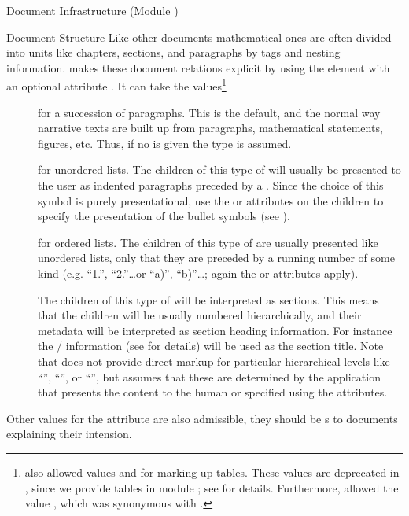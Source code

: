 \begin{tchapter}[id=omdoc-infrastructure,short=Document Infrastructure]{Document Infrastructure (Module )}
{\begin{tsection}[id=sectioning]{Document Structure}
  Like other documents mathematical ones are often divided into units like chapters,
  sections, and paragraphs by tags and nesting information. \omdoc makes these document
  relations explicit by using the  element with an optional attribute
  . It can take the values\footnote{ also allowed
    values  and
     for marking up tables.  These values
    are deprecated in , since we provide tables in module ;
    see  for details. Furthermore,  allowed the value
    , which was synonymous with
    .}
\begin{description}
\item[] for a succession of paragraphs. This is the
  default, and the normal way narrative texts are built up from paragraphs, mathematical
  statements, figures, etc. Thus, if no  is given the type
   is assumed.
\item[] for unordered lists. The children of this type of
   will usually be presented to the user as indented paragraphs preceded
  by a . Since the choice of this symbol is purely presentational,
  \omdoc use the {\css}  or 
  attributes on the children to specify the presentation of the
  bullet symbols (see ).
\item[] for ordered lists. The children of this type of
   are usually presented like unordered lists, only that they are
  preceded by a running number of some kind (e.g. ``1.'', ``2.''\ldots or ``a)'',
  ``b)''\ldots; again the  or  attributes
  apply).
\item[] The children of this type of
   will be interpreted as sections. This means that the
  children will be usually numbered hierarchically, and their metadata will be
  interpreted as section heading information. For instance the
  / information (see 
  for details) will be used as the section title. Note that \omdoc does not
  provide direct markup for particular hierarchical levels like
  ``'', ``'', or
  ``'', but assumes that these are determined by the
  application that presents the content to the human or specified using the {\css}
  attributes.
\end{description}
Other values for the  attribute are also admissible, they should be
{s} to documents explaining their intension.
  

\end{tsection}}
\end{tchapter}
